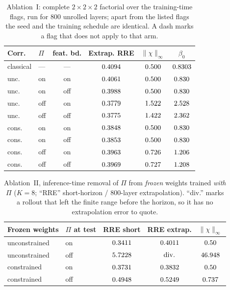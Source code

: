 \documentclass[journal,cmes,article,submit,moreauthors,pdftex]{Definitions/tsp}
\newcommand{\infn}[1]{\lVert #1 \rVert_{\infty}}
\newcommand{\numv}[1]{#1}
\begin{document}
\begin{table}[htbp]
\centering
\caption{Ablation~I: complete $2\times2\times2$ factorial over the training-time flags, run for
$800$ unrolled layers; apart from the listed flags the seed and the training schedule
are identical. A dash marks a flag that does not apply to that arm.}
\label{tab:abl}
\begin{tabular}{llcccc}
\toprule
Corr. & $\Pi$ & feat. bd. & Extrap. RRE & $\infn{\chi}$ & $\beta_0$ \\
\midrule
classical & --- & --- & $\numv{\NumAblClsProjOn}$ & $\numv{\NumAblClsChi}$ & $\numv{\betacert}$ \\
unc.  & on  & on  & $\numv{\NumAblUncPOnFbOnRre}$ & $\numv{\NumAblUncPOnFbOnChi}$ & $\numv{\NumBetaUncPOnFbOn}$ \\
unc.  & on  & off & $\numv{\NumAblUncPOnFbOffRre}$ & $\numv{\NumAblUncPOnFbOffChi}$ & $\numv{\NumBetaUncPOnFbOff}$ \\
unc.  & off & on  & $\numv{\NumAblUncPOffFbOnRre}$ & $\numv{\NumAblUncPOffFbOnChi}$ & $\numv{\NumBetaUncPOffFbOn}$ \\
unc.  & off & off & $\numv{\NumAblUncPOffFbOffRre}$ & $\numv{\NumAblUncPOffFbOffChi}$ & $\numv{\NumBetaUncPOffFbOff}$ \\
cons. & on  & on  & $\numv{\NumAblConsPOnFbOnRre}$ & $\numv{\NumAblConsPOnFbOnChi}$ & $\numv{\NumBetaConsPOnFbOn}$ \\
cons. & on  & off & $\numv{\NumAblConsPOnFbOffRre}$ & $\numv{\NumAblConsPOnFbOffChi}$ & $\numv{\NumBetaConsPOnFbOff}$ \\
cons. & off & on  & $\numv{\NumAblConsPOffFbOnRre}$ & $\numv{\NumAblConsPOffFbOnChi}$ & $\numv{\NumBetaConsPOffFbOn}$ \\
cons. & off & off & $\numv{\NumAblConsPOffFbOffRre}$ & $\numv{\NumAblConsPOffFbOffChi}$ & $\numv{\NumBetaConsPOffFbOff}$ \\
\bottomrule
\end{tabular}
\end{table}
\begin{table}[htbp]
\centering
\caption{Ablation~II, inference-time removal of $\Pi$ from \emph{frozen} weights trained
\emph{with} $\Pi$ ($K=8$; ``RRE'' short-horizon / $800$-layer extrapolation).
``div.'' marks a rollout that left the finite range before the horizon, so it has no
extrapolation error to quote.}
\label{tab:abl2}
\begin{tabular}{llccc}
\toprule
Frozen weights & $\Pi$ at test & RRE short & RRE extrap. & $\infn{\chi}$ \\
\midrule
unconstrained & on  & $\numv{\NumFrzUncOnShort}$ & $\numv{\NumFrzUncOn}$ & $\numv{\chimax}$ \\
unconstrained & off & $\numv{\NumFrzUncOffShort}$ & $\numv{\NumFrzUncOff}$ & $\numv{\NumFrzUncOffChi}$ \\
constrained   & on  & $\numv{\NumFrzConsOnShort}$ & $\numv{\NumFrzConsOn}$ & $\numv{\chimax}$ \\
constrained   & off & $\numv{\NumFrzConsOffShort}$ & $\numv{\NumFrzConsOff}$ & $\numv{\NumFrzConsOffChi}$ \\
\bottomrule
\end{tabular}
\end{table}
\end{document}
